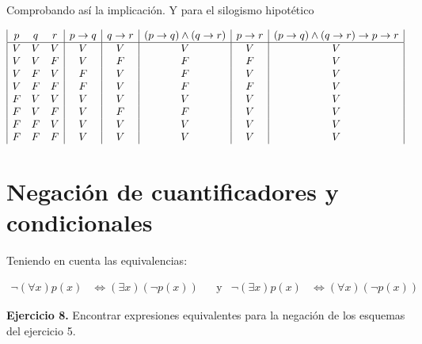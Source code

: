 Comprobando as\'i la implicaci\'on. Y para el silogismo hipot\'etico

\begin{displaymath}
	\hspace*{-0cm}
	\begin{array}{|c c c|c|c|c|c|c|}
		p & q & r & p \rightarrow q & q \rightarrow r & (p \rightarrow q) \wedge (q \rightarrow r) & p \rightarrow r & (p \rightarrow q) \wedge (q \rightarrow r) \rightarrow p \rightarrow r\\
		\hline 
		V & V & V & V & V & V & V & V\\
		V & V & F & V & F & F & F & V\\
		V & F & V & F & V & F & V & V\\
		V & F & F & F & V & F & F & V\\
		F & V & V & V & V & V & V & V\\
		F & V & F & V & F & F & V & V\\
		F & F & V & V & V & V & V & V\\
		F & F & F & V & V & V & V & V\\
	\end{array}
\end{displaymath}

\section{Negaci\'on de cuantificadores y condicionales}

Teniendo en cuenta las equivalencias:

\begin{align}
	\neg (\forall x)p(x) &\Leftrightarrow (\exists x)(\neg p(x)) & &\text{y} & \neg(\exists x)p(x) &\Leftrightarrow (\forall x)(\neg p(x))
\end{align}

\textbf{Ejercicio 8.} Encontrar expresiones equivalentes para la negación de los esquemas del ejercicio 5.

